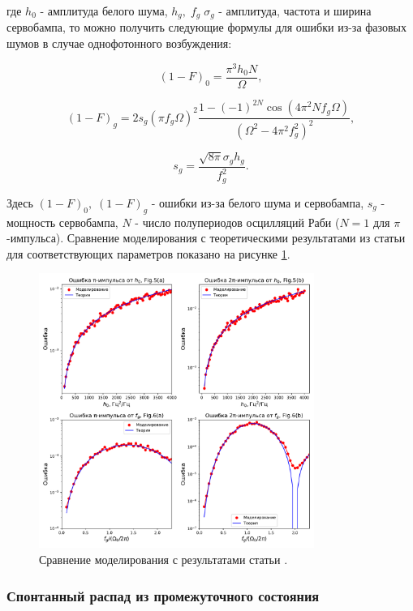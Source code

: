 где $h_0$ - амплитуда белого шума, $h_g, \;f_g \; \sigma_g$ - амплитуда, частота и ширина сервобампа, то можно получить следующие формулы для ошибки из-за фазовых шумов в случае однофотонного возбуждения:

\begin{equation}
	(1-F)_{0} = \frac{\pi^3 h_0 N}{\Omega},
\end{equation}

\begin{equation}
	(1-F)_{g} = 2 s_g (\pi f_g \Omega)^2\frac{1-(-1)^{2N}\cos\left(4\pi^2 N f_g \Omega \right)}{(\Omega^2 - 4\pi^2 f_g^2)^2},
\end{equation}

\begin{equation}
	s_g = \frac{\sqrt{8\pi} \sigma_g h_g}{f_g^2}.
\end{equation}

Здесь $(1-F)_0, \; (1-F)_g$ - ошибки из-за белого шума и сервобампа, $s_g$ - мощность сервобампа, $N$ - число полупериодов осцилляций Раби ($N=1$ для $\pi$-импульса). Сравнение моделирования с теоретическими результатами из статьи для соответствующих параметров показано на рисунке \ref{fig:noise_errors}.

\begin{figure}[ht]
	\centering
	\includegraphics[width=0.8\textwidth]{images/noise_errors.pdf}
	\caption{Сравнение моделирования с результатами статьи \cite{Saffman_Noise}.}
	\label{fig:noise_errors}
\end{figure}

\subsubsection{Спонтанный распад из промежуточного состояния}

